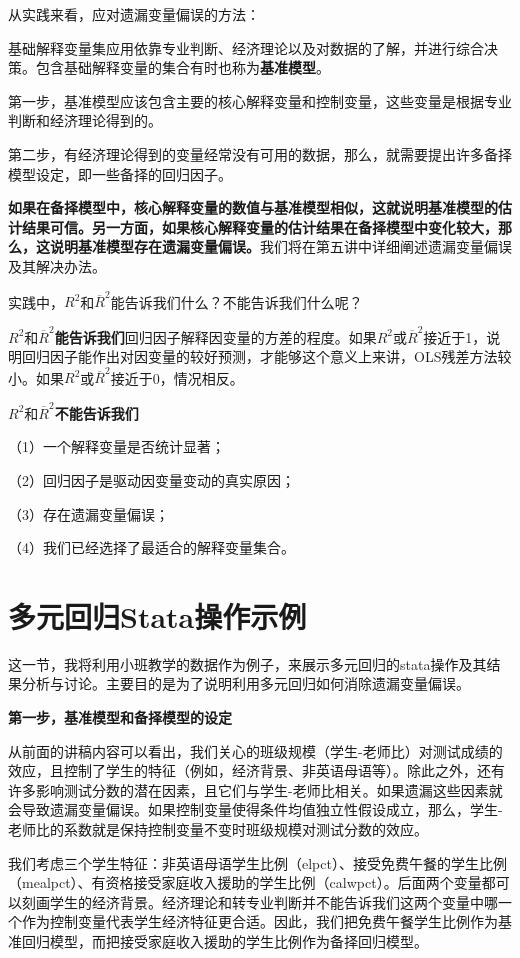 \documentclass[cn,12pt,math=newtx,citestyle=gb7714-2015,bibstyle=gb7714-2015]{elegantbook}
\begin{document}
	从实践来看，应对遗漏变量偏误的方法：
	
	基础解释变量集应用依靠专业判断、经济理论以及对数据的了解，并进行综合决策。包含基础解释变量的集合有时也称为\textbf{基准模型}。
	
	第一步，基准模型应该包含主要的核心解释变量和控制变量，这些变量是根据专业判断和经济理论得到的。
	
	第二步，有经济理论得到的变量经常没有可用的数据，那么，就需要提出许多备择模型设定，即一些备择的回归因子。
	
	\textbf{如果在备择模型中，核心解释变量的数值与基准模型相似，这就说明基准模型的估计结果可信。另一方面，如果核心解释变量的估计结果在备择模型中变化较大，那么，这说明基准模型存在遗漏变量偏误。}我们将在第五讲中详细阐述遗漏变量偏误及其解决办法。
	
	实践中，$R^2$和$\overline{R}^2$能告诉我们什么？不能告诉我们什么呢？
	
	$R^2$和$\overline{R}^2$\textbf{能告诉我们}回归因子解释因变量的方差的程度。如果$R^2$或$\overline{R}^2$接近于1，说明回归因子能作出对因变量的较好预测，才能够这个意义上来讲，OLS残差方法较小。如果$R^2$或$\overline{R}^2$接近于0，情况相反。
	
	$R^2$和$\overline{R}^2$\textbf{不能告诉我们}
	
	（1）一个解释变量是否统计显著；
	
	（2）回归因子是驱动因变量变动的真实原因；
	
	（3）存在遗漏变量偏误；
	
	（4）我们已经选择了最适合的解释变量集合。
	
	\section{多元回归Stata操作示例}
	这一节，我将利用小班教学的数据作为例子，来展示多元回归的stata操作及其结果分析与讨论。主要目的是为了说明利用多元回归如何消除遗漏变量偏误。
	
	\textbf{第一步，基准模型和备择模型的设定}
	
	从前面的讲稿内容可以看出，我们关心的班级规模（学生-老师比）对测试成绩的效应，且控制了学生的特征（例如，经济背景、非英语母语等）。除此之外，还有许多影响测试分数的潜在因素，且它们与学生-老师比相关。如果遗漏这些因素就会导致遗漏变量偏误。如果控制变量使得条件均值独立性假设成立，那么，学生-老师比的系数就是保持控制变量不变时班级规模对测试分数的效应。
	
	我们考虑三个学生特征：非英语母语学生比例（elpct）、接受免费午餐的学生比例（mealpct）、有资格接受家庭收入援助的学生比例（calwpct）。后面两个变量都可以刻画学生的经济背景。经济理论和转专业判断并不能告诉我们这两个变量中哪一个作为控制变量代表学生经济特征更合适。因此，我们把免费午餐学生比例作为基准回归模型，而把接受家庭收入援助的学生比例作为备择回归模型。
	
\end{document}
